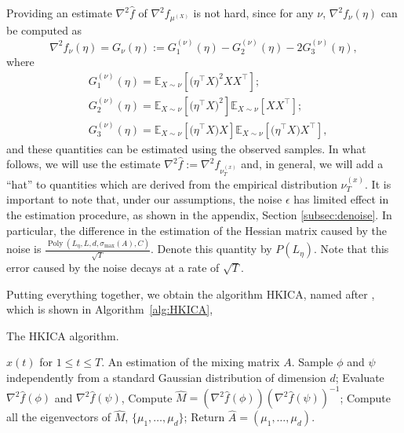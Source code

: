 \documentclass{article}
\newcommand{\E}{\mathbb{E}}
\DeclareMathOperator{\pol}{Poly}
\newcommand{\poly}[1]{\pol\left(#1\right)}
\theoremstyle{definition}
\begin{document}
Providing an estimate $\nabla^2 \hat{f}$ of $\nabla^2f_{\mu^{(X)}}$ is not hard, since for any $\nu$,
$\nabla^2f_{\nu}(\eta)$  can be computed as
\begin{equation}
\label{eq:G}
\nabla^2 f_{\nu}(\eta) = G_{\nu}(\eta):= G_1^{(\nu)}(\eta) - G_2^{(\nu)}(\eta) -2G_3^{(\nu)}(\eta),
\end{equation}
where 
\vspace{-3mm}
\begin{align*}
& G_1^{(\nu)}(\eta) =  \E_{X\sim \nu} [\big(\eta^{\top}X\big)^2XX^{\top}]; \\
& G_2^{(\nu)}(\eta) = \E_{X\sim \nu} [\big(\eta^{\top}X\big)^2] \E_{X\sim \nu} [XX^{\top}]; \\
& G_3^{(\nu)}(\eta) = \E_{X\sim \nu} [\big(\eta^{\top}X\big)X] \E_{X\sim \nu} [\big(\eta^{\top}X\big)X^{\top}],
\end{align*} 
and these quantities can be estimated using the observed samples. In what follows, we will use the estimate $\nabla^2 \hat{f}:=\nabla^2 f_{\nu_T^{(x)}}$ and, in general, we will add a ``hat'' to quantities which are derived from the empirical distribution $\nu_T^{(x)}$. 
It is important to note that, under our assumptions, the noise $\epsilon$ has limited effect in the estimation procedure, as shown in the appendix, Section \ref{subsec:denoise}. 
In particular, the difference in the estimation of the Hessian matrix caused by the noise is $\frac{\poly{L_{\eta}, L, d, \sigma_{\max}(A), C}}{\sqrt{T}}$. Denote this quantity by $P(L_{\eta})$. 
Note that this error caused by the noise decays at a rate of $\sqrt{T}$.



Putting everything together, we obtain the algorithm HKICA, named after \citet{hsu2013learning}, which is shown in Algorithm~\ref{alg:HKICA},
\begin{algorithm}[H]
\caption{The HKICA algorithm.}
\label{alg:HKICA}
\begin{algorithmic}[1]
\INPUT $x(t)$ for $1\le t \le T$. 
\OUTPUT An estimation of the mixing matrix $A$. 
\STATE Sample $\phi$ and $\psi$ independently from a standard Gaussian distribution of dimension $d$;
\STATE Evaluate $\nabla^2\hat{f}(\phi)$ and $\nabla^2\hat{f}(\psi)$, 
\STATE Compute $\hat{M} = (\nabla^2 \hat{f}(\phi))(\nabla^2\hat{f}(\psi))^{-1}$;
\STATE Compute all the eigenvectors of $\hat{M}$, $\{\mu_1,\ldots,\mu_d\}$;
\STATE Return $\hat{A} = (\mu_1,\ldots,\mu_d)$.
\end{algorithmic}
\end{algorithm}
\end{document}
